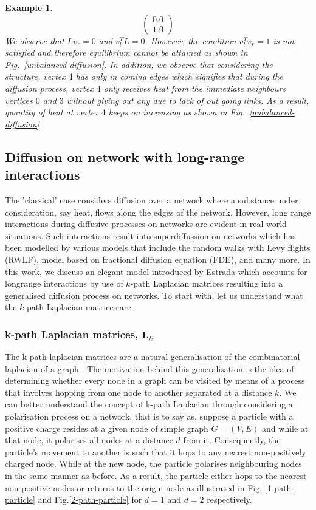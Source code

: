 \documentclass[10pt,a4paper]{article}
\newtheorem{exa}{Example}
\begin{document}
\begin{exa}
\begin{equation*}
\begin{pmatrix}
   0.0 \\
   1.0
   \end{pmatrix}
   \end{equation*}
   We observe that $Lv_r = 0$ and $v_l^TL = 0$. However, the condition $v_l^T v_r = 1$  is not satisfied and therefore equilibrium cannot be attained as shown in Fig.~\ref{unbalanced-diffusion}. In addition, we observe that considering the structure, vertex $4$ has only in coming edges which signifies that during the diffusion process, vertex $4$ only receives heat from the immediate neighbours vertices $0$ and $3$ without giving out any due to lack of out going links. As a result, quantity of heat at vertex $4$ keeps on increasing as shown in Fig.~\ref{unbalanced-diffusion}.
   \end{exa}
	
    \subsection{Diffusion on network with long-range interactions}
    The 'classical' case considers diffusion over a network where a substance under consideration, say heat, flows along the edges of the network. However, long range interactions during diffusive processes on networks are evident in real world situations. Such interactions result into superdiffussion on networks which has been modelled by various models that include the random walks with Levy flights (RWLF), model based on fractional diffusion equation (FDE), and many more. In this work, we discuss an elegant model introduced by Estrada \citep{estrada2017path} which accounts for longrange interactions by use of $k$-path Laplacian matrices resulting into a generalised diffusion process on networks. To start with, let us understand what the $k$-path Laplacian matrices are.
    	    \subsubsection{ k-path Laplacian matrices, $\mathbf{L}_k$}
    	    The k-path laplacian matrices are a natural generalisation of the combinatorial laplacian of a graph \citep{estrada2012path}. The motivation behind this generalisation is the idea of determining whether every node in a graph can be visited by means of a process that involves hopping from one node to another separated at a distance $k$. We can better understand the concept of k-path Laplacian through considering a polarisation process on a network, that is to say as, suppose a particle with a positive charge resides at a given node of simple graph $G= (V,E)$ and while at that node, it polarises all nodes at a distance $d$ from it. Consequently, the particle's movement to another is such that it hops to any nearest non-positively charged node. While at the new node, the particle polarises neighbouring nodes in the same manner as before. As a result, the particle either hops to the nearest non-positive nodes or returns to the origin node as illustrated in Fig. \ref{1-path-particle} and Fig.\ref{2-path-particle} for $d=1$ and $d=2$ respectively.
    	    
\end{document}
